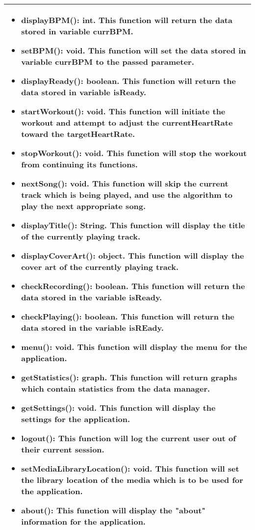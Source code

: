 \begin{center}
\begin{tabular}{|C{15cm}|}
\begin{itemize}
					\item displayBPM(): int. This function will return the data stored in variable currBPM.
					\item setBPM(): void. This function will set the data stored in variable currBPM to the passed parameter.
					\item displayReady(): boolean. This function will return the data stored in variable isReady.
					\item startWorkout(): void. This function will initiate the workout and attempt to adjust the currentHeartRate toward the targetHeartRate.
					\item stopWorkout(): void. This function will stop the workout from continuing its functions.
					\item nextSong(): void. This function will skip the current track which is being played, and use the algorithm to play the next appropriate song.
					\item displayTitle(): String. This function will display the title of the currently playing track.
					\item displayCoverArt(): object. This function will display the cover art of the currently playing track.
					\item checkRecording(): boolean. This function will return the data stored in the variable isReady.
					\item checkPlaying(): boolean. This function will return the data stored in the variable isREady.
					\item menu(): void. This function will display the menu for the application.
					\item getStatistics(): graph. This function will return graphs which contain statistics from the data manager.
					\item getSettings(): void. This function will display the settings for the application.
					\item logout(): This function will log the current user out of their current session.
					\item setMediaLibraryLocation(): void. This function will set the library location of the media which is to be  used for the application.
					\item about(): This function will display the "about" information for the application.
				\end{itemize}\\
			\hline
	\end{tabular}
\end{center}

